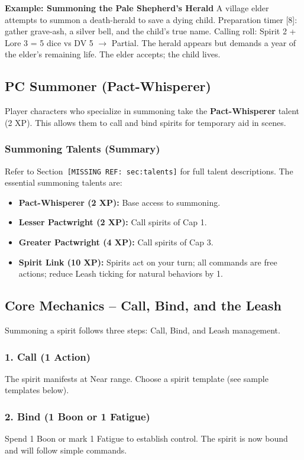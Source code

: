 \textbf{Example: Summoning the Pale Shepherd's Herald}
A village elder attempts to summon a death-herald to save a dying child. Preparation timer [8]: gather grave-ash, a silver bell, and the child's true name. Calling roll: Spirit 2 + Lore 3 = 5 dice vs DV 5 $\rightarrow$ Partial. The herald appears but demands a year of the elder's remaining life. The elder accepts; the child lives.

\subsection{PC Summoner (Pact-Whisperer)}

Player characters who specialize in summoning take the \textbf{Pact-Whisperer} talent (2 XP). This allows them to call and bind spirits for temporary aid in scenes.

\subsubsection{Summoning Talents (Summary)}

Refer to Section~\texttt{[MISSING REF: sec:talents]} for full talent descriptions. The essential summoning talents are:
\begin{itemize}
  \item \textbf{Pact-Whisperer (2 XP):} Base access to summoning.
  \item \textbf{Lesser Pactwright (2 XP):} Call spirits of Cap 1.
  \item \textbf{Greater Pactwright (4 XP):} Call spirits of Cap 3.
  \item \textbf{Spirit Link (10 XP):} Spirits act on your turn; all commands are free actions; reduce Leash ticking for natural behaviors by 1.
\end{itemize}

\subsection{Core Mechanics -- Call, Bind, and the Leash}

Summoning a spirit follows three steps: Call, Bind, and Leash management.

\subsubsection{1. Call (1 Action)}
The spirit manifests at Near range. Choose a spirit template (see sample templates below).

\subsubsection{2. Bind (1 Boon or 1 Fatigue)}
Spend 1 Boon or mark 1 Fatigue to establish control. The spirit is now bound and will follow simple commands.

